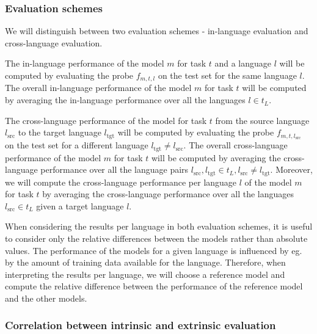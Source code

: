 
\subsubsection{Evaluation schemes}

We will distinguish between two evaluation schemes - in-language evaluation and cross-language  evaluation. 

The in-language performance of the model $m$ for task $t$ and a language $l$ will be computed by evaluating the probe $f_{m, t, l}$ on the test set for the same language $l$. 
The overall in-language performance of the model $m$ for task $t$ will be computed by averaging the in-language performance over all the languages $l \in t_L$. 

The cross-language performance of the model for task $t$ from the source language $l_\mathrm{src}$ to the target language $l_\mathrm{tgt}$ will be computed by evaluating the probe $f_{m, t, l_\mathrm{src}}$ on the test set for a different language $l_\mathrm{tgt} \neq l_\mathrm{src}$. 
The overall cross-language performance of the model $m$ for task $t$ will be computed by averaging the cross-language performance over all the language pairs $l_\mathrm{src}, l_\mathrm{tgt} \in t_L, l_\mathrm{src} \neq l_\mathrm{tgt}$.
Moreover, we will compute the cross-language performance per language $l$ of the model $m$ for task $t$ by averaging the cross-language performance over all the languages $l_\mathrm{src} \in t_L$ given a target language $l$.

When considering the results per language in both evaluation schemes, it is useful to consider only the relative differences between the models rather than absolute values. The performance of the models for a given language is influenced by eg. by the amount of training data available for the language. Therefore, when interpreting the results per language, we will choose a reference model and compute the relative difference between the performance of the reference model and the other models.

\subsubsection{Correlation between intrinsic and extrinsic evaluation}
\label{sec:correlation_intrinsic_extrinsic}

